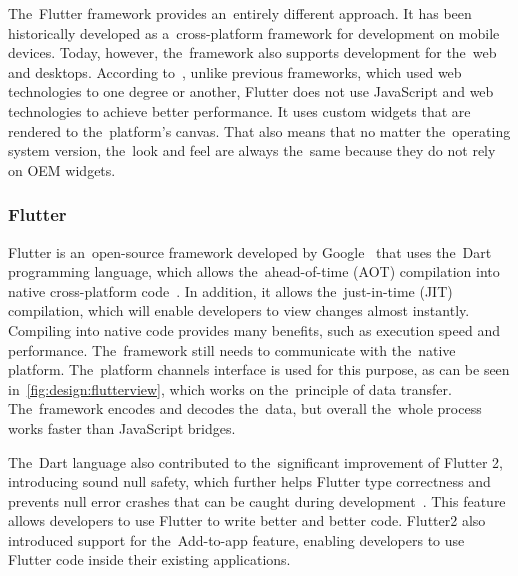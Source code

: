 The~Flutter framework provides an~entirely different approach.
It has been historically developed as a~cross-platform framework for development on mobile devices.
Today, however, the~framework also supports development for the~web and desktops.
According to~\cite{leler_2017_whats}, unlike previous frameworks, which used web technologies to one degree or another, Flutter does not use JavaScript and web technologies to achieve better performance.
It uses custom widgets that are rendered to the~platform's canvas.
That also means that no matter the~operating system version, the~look and feel are always the~same because they do not rely on OEM widgets. 

\subsubsection{Flutter}

Flutter is an~open-source framework developed by Google~\cite{a2022_flutter} that uses the~Dart programming language, which allows the~ahead-of-time (AOT) compilation into native cross-platform code~\cite{leler_2017_whats}.
In addition, it allows the~just-in-time (JIT) compilation, which will enable developers to view changes almost instantly.
Compiling into native code provides many benefits, such as execution speed and performance.
The~framework still needs to communicate with the~native platform.
The~platform channels interface is used for this purpose, as can be seen in~\ref{fig:design:flutterview}, which works on the~principle of data transfer.
The~framework encodes and decodes the~data, but overall the~whole process works faster than JavaScript bridges.

The~Dart language also contributed to the~significant improvement of Flutter 2, introducing sound null safety, which further helps Flutter type correctness and prevents null error crashes that can be caught during development~\cite{sells_2021_whats}.
This feature allows developers to use Flutter to write better and better code.
Flutter2 also introduced support for the~Add-to-app feature, enabling developers to use Flutter code inside their existing applications.

